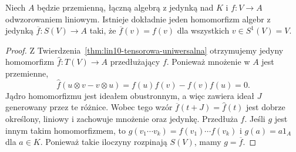 \begin{twierdzenie}
\label{thm:lin10-sym-uniwersalna}
Niech \(A\) będzie przemienną,
łączną algebrą z jedynką nad \(K\)
i \(f\colon V\to A\) odwzorowaniem
liniowym. Istnieje dokładnie jeden
homomorfizm algebr z jedynką
\(\overline f\colon S(V)\to A\)
taki, że \(\overline f(v)=f(v)\)
dla wszystkich \(v\in S^1(V)=V\).
\end{twierdzenie}
\begin{proof}
Z Twierdzenia~\ref{thm:lin10-tensorowa-uniwersalna}
otrzymujemy jedyny homomorfizm
\(\widehat f\colon T(V)\to A\)
przedłużający \(f\).
Ponieważ mnożenie w \(A\)
jest przemienne,
\[
 \widehat f(u\otimes v-v\otimes u)
 =f(u)f(v)-f(v)f(u)=0.
\]
Jądro homomorfizmu jest
ideałem obustronnym, a więc
zawiera ideał \(J\) generowany
przez te różnice.
Wobec tego wzór
\(\overline f(t+J)=\widehat f(t)\)
jest dobrze określony, liniowy
i zachowuje mnożenie oraz jedynkę.
Przedłuża \(f\).
Jeśli \(g\) jest innym takim
homomorfizmem, to
\(g(v_1\cdots v_k)
=f(v_1)\cdots f(v_k)\)
i \(g(a)=a1_A\) dla \(a\in K\).
Ponieważ takie iloczyny
rozpinają \(S(V)\), mamy
\(g=\overline f\).
\end{proof}

